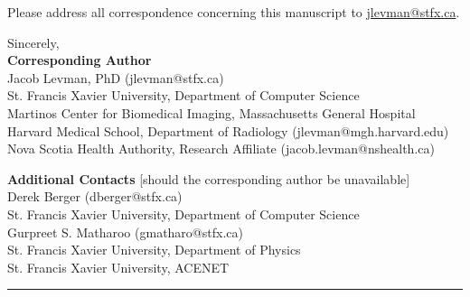 \documentclass[10pt,letter]{article}
\begin{document}
Please address all correspondence concerning this manuscript to \href{jlevman@stfx.ca}{jlevman@stfx.ca}.




\bigskip

\noindent
Sincerely, \\

\small
\noindent
\textbf{Corresponding Author}\\
Jacob Levman, PhD (jlevman@stfx.ca) \\
\footnotesize
\hspace*{0.25cm}St. Francis Xavier University, Department of Computer Science  \\
\hspace*{0.25cm}Martinos Center for Biomedical Imaging, Massachusetts General Hospital \\
\hspace*{0.25cm}Harvard Medical School, Department of Radiology (jlevman@mgh.harvard.edu) \\
\hspace*{0.25cm}Nova Scotia Health Authority, Research Affiliate (jacob.levman@nshealth.ca) \\
\normalsize

\small
\noindent
\textbf{Additional Contacts} [should the corresponding author be unavailable]\\
Derek Berger (dberger@stfx.ca)\\
\footnotesize
\hspace*{0.25cm} St. Francis Xavier University, Department of Computer Science \\
\small
Gurpreet S. Matharoo (gmatharo@stfx.ca) \\
\footnotesize
\hspace*{0.25cm} St. Francis Xavier University, Department of Physics \\
\hspace*{0.25cm} St. Francis Xavier University, ACENET
\normalsize






% 

\footnotesize
\begin{center}
\noindent\rule{6cm}{0.4pt}
\end{center}

\AtNextBibliography{\footnotesize}
\printbibliography[heading=none]
\end{document}
